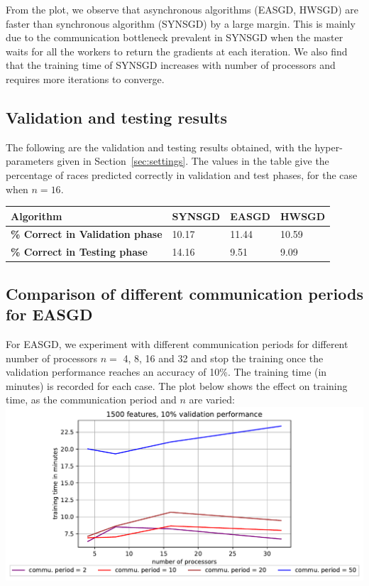 \documentclass[12pt]{article}
\begin{document}
From the plot, we observe that asynchronous algorithms (EASGD, HWSGD) are faster than synchronous algorithm (SYNSGD) by a large margin. This is mainly due to the communication bottleneck prevalent in SYNSGD when the master waits for all the workers to return the gradients at each iteration. We also find that the training time of SYNSGD increases with number of processors and requires more iterations to converge.

\subsection{Validation and testing results}
The following are the validation and testing results obtained, with the hyper-parameters given in Section~\ref{sec:settings}. The values in the table give the percentage of races predicted correctly in validation and test phases, for the case when $n=16$. 
\begin{table}[ht]
\centering
 \begin{tabular}{llll} 
 \toprule
\textbf{Algorithm} & SYNSGD & EASGD & HWSGD \\ \midrule
\textbf{\% Correct in Validation phase} & 10.17 & 11.44 & 10.59 \\
\textbf{\% Correct in Testing phase} & 14.16 & 9.51 & 9.09 \\
\bottomrule
\end{tabular}
\end{table}

\subsection{Comparison of different communication periods for EASGD}
For EASGD, we experiment with different communication periods for different number of processors $n=$ 4, 8, 16 and 32 and stop the training once the validation performance reaches an accuracy of 10\%. The  training  time (in  minutes)  is  recorded  for  each  case. The plot below shows the effect on training time, as the communication period and $n$ are varied:\\

{\centering
\includegraphics[width=14cm]{images/1500f_10v_ea.pdf}\\
}
\end{document}
